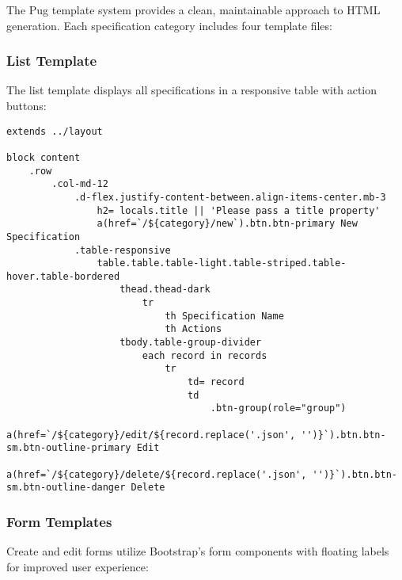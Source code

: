 \documentclass[11pt,a4paper]{article}
\begin{document}
The Pug template system provides a clean, maintainable approach to HTML generation. Each specification category includes four template files:

\subsubsection{List Template}
The list template displays all specifications in a responsive table with action buttons:

\begin{lstlisting}[language=Pug, caption=List Template Pattern]
extends ../layout

block content
    .row 
        .col-md-12
            .d-flex.justify-content-between.align-items-center.mb-3
                h2= locals.title || 'Please pass a title property'
                a(href=`/${category}/new`).btn.btn-primary New Specification
            .table-responsive
                table.table.table-light.table-striped.table-hover.table-bordered
                    thead.thead-dark 
                        tr
                            th Specification Name
                            th Actions
                    tbody.table-group-divider
                        each record in records
                            tr 
                                td= record
                                td
                                    .btn-group(role="group")
                                        a(href=`/${category}/edit/${record.replace('.json', '')}`).btn.btn-sm.btn-outline-primary Edit
                                        a(href=`/${category}/delete/${record.replace('.json', '')}`).btn.btn-sm.btn-outline-danger Delete
\end{lstlisting}

\subsubsection{Form Templates}
Create and edit forms utilize Bootstrap's form components with floating labels for improved user experience:
\end{document}
